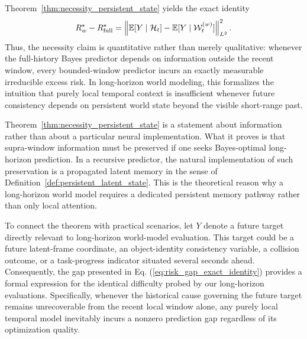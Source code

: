 \begin{remark}
\label{rem:information_theoretic_meaning}
Theorem~\ref{thm:necessity_persistent_state} yields the exact identity
\begin{equation}
R_w^\star - R_{\mathrm{full}}^\star
=
\left\lVert 
\mathbb{E}[Y\mid \mathcal{H}_t] - \mathbb{E}[Y\mid \mathcal{W}_t^{(w)}]
 \right\rVert_{L^2}^2.
\label{eq:information_theoretic_identity}
\end{equation}
Thus, the necessity claim is quantitative rather than merely qualitative: whenever the full-history Bayes predictor depends on information outside the recent window, every bounded-window predictor incurs an exactly measurable irreducible excess risk. In long-horizon world modeling, this formalizes the intuition that purely local temporal context is insufficient whenever future consistency depends on persistent world state beyond the visible short-range past.
\end{remark}

\begin{remark}
\label{rem:architectural_interpretation}
Theorem~\ref{thm:necessity_persistent_state} is a statement about information rather than about a particular neural implementation. What it proves is that supra-window information must be preserved if one seeks Bayes-optimal long-horizon prediction. In a recursive predictor, the natural implementation of such preservation is a propagated latent memory in the sense of Definition~\ref{def:persistent_latent_state}. This is the theoretical reason why a long-horizon world model requires a dedicated persistent memory pathway rather than only local attention.
\end{remark}

\begin{remark}
\label{rem:connection_to_experiments}
To connect the theorem with practical scenarios, let $Y$ denote a future target directly relevant to long-horizon world-model evaluation. This target could be a future latent-frame coordinate, an object-identity consistency variable, a collision outcome, or a task-progress indicator situated several seconds ahead. Consequently, the gap presented in Eq. (\ref{eq:risk_gap_exact_identity}) provides a formal expression for the identical difficulty probed by our long-horizon evaluations. Specifically, whenever the historical cause governing the future target remains unrecoverable from the recent local window alone, any purely local temporal model inevitably incurs a nonzero prediction gap regardless of its optimization quality.
\end{remark}




















